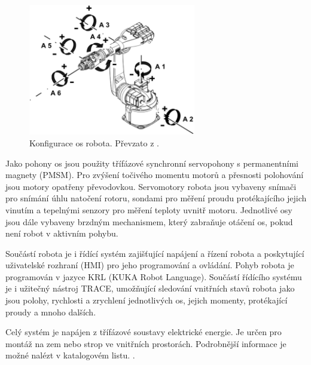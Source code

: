\begin{figure}[ht]
\includegraphics[width=0.65\textwidth]{kuka_kr5_axes}
\caption{Konfigurace os robota. Převzato z \cite{kuka_datasheet_url}.}
\label{kuka_kr5_axes_pic}
\end{figure}

Jako pohony os jsou použity třífázové synchronní servopohony s permanentními magnety (PMSM). Pro zvýšení točivého momentu motorů a přesnosti polohování jsou motory opatřeny převodovkou. Servomotory robota jsou vybaveny snímači pro snímání úhlu natočení rotoru, sondami pro měření proudu protékajícího jejich vinutím a tepelnými senzory pro měření teploty uvnitř motoru. Jednotlivé osy jsou dále vybaveny brzdným mechanismem, který zabraňuje otáčení os, pokud není robot v aktivním pohybu. 

Součástí robota je i řídící systém zajišťující napájení a řízení robota a poskytující uživatelské rozhraní (HMI) pro jeho programování a ovládání. Pohyb robota je programován v jazyce KRL (KUKA Robot Language). Součástí řídícího systému je i užitečný nástroj TRACE, umožňující sledování vnitřních stavů robota jako jsou polohy, rychlosti a zrychlení jednotlivých os, jejich momenty, protékající proudy a mnoho dalších. 

Celý systém je napájen z třífázové soustavy elektrické energie. Je určen pro montáž na zem nebo strop ve vnitřních prostorách. Podrobnější informace je možné nalézt v katalogovém listu. \cite{kuka_datasheet_url}.